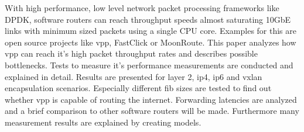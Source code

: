 \small

With high performance, low level network packet processing frameworks
like DPDK, software routers can reach throughput speeds almost
saturating 10GbE links with minimum sized packets using a single CPU
core. Examples for this are open source projects like \Ac{vpp},
FastClick or MoonRoute. This paper analyzes how \Ac{vpp} can reach
it's high packet throughput rates and describes possible bottlenecks.
Tests to measure it's performance measurements are conducted and
explained in detail. Results are presented for layer 2, \Ac{ip4},
\Ac{ip6} and \Ac{vxlan} encapsulation scenarios. Especially different
\Ac{fib} sizes are tested to find out whether \Ac{vpp} is capable of
routing the internet. Forwarding latencies are analyzed and a brief
comparison to other software routers will be made. Furthermore many
measurement results are explained by creating models.


